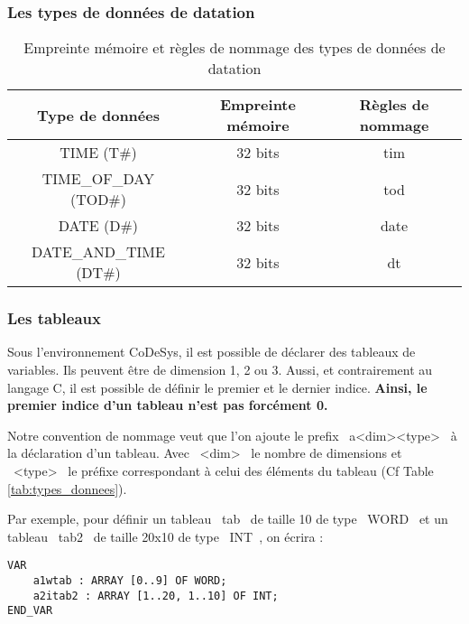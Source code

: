 \subsubsection{Les types de données de datation}
\begin{table}[htbp]
    \centering
    \begin{tabular}{|c|c|c|}
        \hline
        \rowcolor{gray!30} \textbf{Type de données} & \textbf{Empreinte mémoire} & \textbf{Règles de nommage} \\
        \hline
        TIME (T\#) & 32 bits & tim \\
        \hline
        TIME\_OF\_DAY (TOD\#) & 32 bits & tod \\
        \hline
        DATE (D\#) & 32 bits & date \\
        \hline
        DATE\_AND\_TIME (DT\#) & 32 bits & dt \\
        \hline
    \end{tabular}
    \caption{Empreinte mémoire et règles de nommage des types de données de datation}
\end{table}

\subsubsection{Les tableaux}
Sous l'environnement CoDeSys, il est possible de déclarer des tableaux de variables. Ils peuvent être de dimension 1, 2 ou 3. Aussi, et contrairement au langage C, il est possible de définir le premier et le dernier indice. \textbf{Ainsi, le premier indice d'un tableau n'est pas forcément 0.} 


Notre convention de nommage veut que l'on ajoute le prefix ~a<dim><type>~ à la déclaration d'un tableau. Avec ~<dim>~ le nombre de dimensions et ~<type>~ le préfixe correspondant à celui des éléments du tableau (Cf Table \ref{tab:types_donnees}).

Par exemple, pour définir un tableau ~tab~ de taille 10 de type ~WORD~ et un tableau ~tab2~ de taille 20x10 de type ~INT~, on écrira :
\begin{lstlisting}[language=ST]
VAR 
    a1wtab : ARRAY [0..9] OF WORD;
    a2itab2 : ARRAY [1..20, 1..10] OF INT;
END_VAR
\end{lstlisting}

